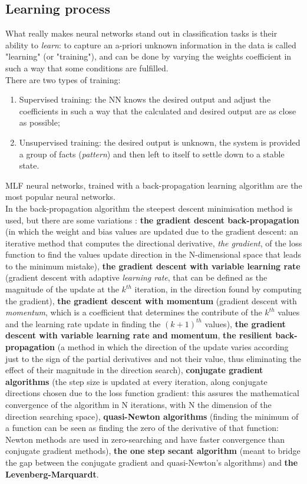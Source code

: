 \documentclass[../main.tex]{subfiles}
\begin{document}
\vspace{5mm}
\subsection{Learning process}
What really makes neural networks stand out in classification tasks is their ability to \textit{learn}: to capture an a-priori unknown information in the data is called "learning" (or "training"), and can be done by varying the weights coefficient in such a way that some conditions are fulfilled. \cite{Svozil1997} \\ 
There are two types of training: 
\begin{enumerate}
	\item Supervised training: the NN knows the desired output and adjust the coefficients in such a way that the calculated and desired output are as close as possible;
	\item Unsupervised training: the desired output is unknown, the system is provided a group of facts (\textit{pattern}) and then left to itself to settle down to a stable state.
\end{enumerate}
MLF neural networks, trained with a back-propagation learning algorithm are the most popular neural networks. \cite{Svozil1997} \\
In the back-propagation algorithm the steepest descent minimisation method is  used, but there are some variations \cite{Kuruvilla2014}: \textbf{the gradient descent back-propagation} (in which the weight and bias values are updated due to the gradient descent: an iterative method that computes the directional derivative, \textit{the gradient}, of the loss function to find the values update direction in the N-dimensional space that leads to the minimum mistake), \textbf{the gradient descent with variable learning rate} (gradient descent with adaptive \textit{learning rate}, that can be defined as the magnitude of the update at the $k^{th}$ iteration, in the direction found by computing the gradient), \textbf{the gradient descent with momentum} (gradient descent with \textit{momentum}, which is a coefficient that determines the contribute of the $k^{th}$ values and the learning rate update in finding the $(k+1)^{th}$ values), \textbf{the gradient descent with variable learning rate and momentum}, \textbf{the resilient back-propagation} (a method in which the direction of the update varies according just to the sign of the partial derivatives and not their value, thus eliminating the effect of their magnitude in the direction search), \textbf{conjugate gradient algorithms} (the step size is updated at every iteration, along conjugate directions chosen due to the loss function gradient: this assures the mathematical convergence of the algorithm in N iterations, with N the dimension of the direction searching space), \textbf{quasi-Newton algorithms} (finding the minimum of a function can be seen as finding the zero of the derivative of that function: Newton methods are used in zero-searching and have faster convergence than conjugate gradient methods), \textbf{the one step secant algorithm} (meant to bridge the gap between the conjugate gradient and quasi-Newton's algorithms) and \textbf{the Levenberg-Marquardt}.
\end{document}
